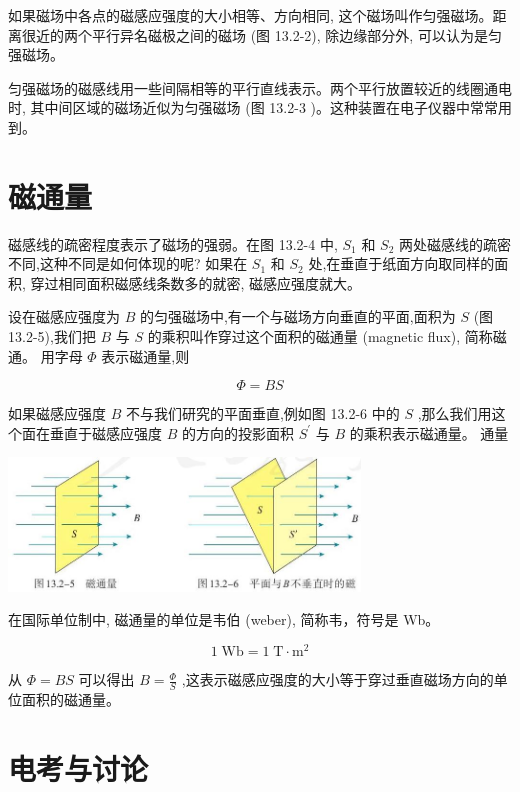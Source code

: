 \documentclass[10pt]{article}
\begin{document}
如果磁场中各点的磁感应强度的大小相等、方向相同, 这个磁场叫作匀强磁场。距离很近的两个平行异名磁极之间的磁场 (图 13.2-2), 除边缘部分外, 可以认为是匀强磁场。

匀强磁场的磁感线用一些间隔相等的平行直线表示。两个平行放置较近的线圈通电时, 其中间区域的磁场近似为匀强磁场 (图 13.2-3 )。这种装置在电子仪器中常常用到。

\section*{磁通量}

磁感线的疏密程度表示了磁场的强弱。在图 13.2-4 中, \({S}_{1}\) 和 \({S}_{2}\) 两处磁感线的疏密不同,这种不同是如何体现的呢? 如果在 \({S}_{1}\) 和 \({S}_{2}\) 处,在垂直于纸面方向取同样的面积, 穿过相同面积磁感线条数多的就密, 磁感应强度就大。

设在磁感应强度为 \(B\) 的匀强磁场中,有一个与磁场方向垂直的平面,面积为 \(S\) (图 13.2-5),我们把 \(B\) 与 \(S\) 的乘积叫作穿过这个面积的磁通量 (magnetic flux), 简称磁通。 用字母 \(\Phi\) 表示磁通量,则

\[
\Phi = {BS}
\]

如果磁感应强度 \(B\) 不与我们研究的平面垂直,例如图 13.2-6 中的 \(S\) ,那么我们用这个面在垂直于磁感应强度 \(B\) 的方向的投影面积 \({S}^{\prime }\) 与 \(B\) 的乘积表示磁通量。 通量

\begin{center}
\includegraphics[max width=0.7\textwidth]{images/01911d5f-8e38-70c0-b5b8-2b399bd115b6_116_787134.jpg}
\end{center}

在国际单位制中, 磁通量的单位是韦伯 (weber), 简称韦，符号是 Wb。

\[
1\mathrm{\;{Wb}} = 1\mathrm{\;T} \cdot {\mathrm{m}}^{2}
\]

从 \(\Phi = {BS}\) 可以得出 \(B = \frac{\Phi }{S}\) ,这表示磁感应强度的大小等于穿过垂直磁场方向的单位面积的磁通量。

\section*{电考与讨论}
\end{document}
